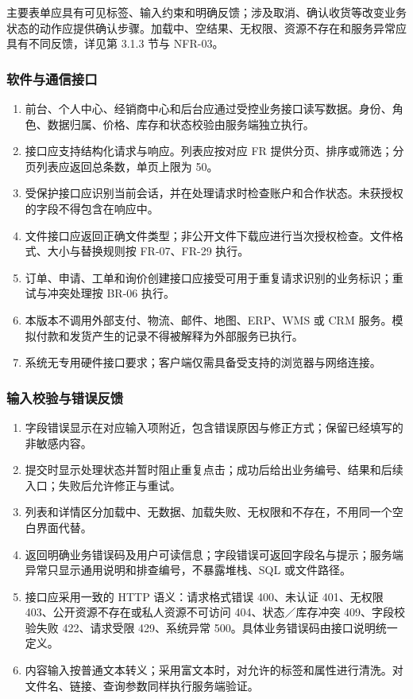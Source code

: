 主要表单应具有可见标签、输入约束和明确反馈；涉及取消、确认收货等改变业务状态的动作应提供确认步骤。加载中、空结果、无权限、资源不存在和服务异常应具有不同反馈，详见第 3.1.3 节与 NFR-03。

\subsubsection{软件与通信接口}\label{sec:312-软件与通信接口}

\begin{enumerate}
\item 前台、个人中心、经销商中心和后台应通过受控业务接口读写数据。身份、角色、数据归属、价格、库存和状态校验由服务端独立执行。
\item 接口应支持结构化请求与响应。列表应按对应 FR 提供分页、排序或筛选；分页列表应返回总条数，单页上限为 50。
\item 受保护接口应识别当前会话，并在处理请求时检查账户和合作状态。未获授权的字段不得包含在响应中。
\item 文件接口应返回正确文件类型；非公开文件下载应进行当次授权检查。文件格式、大小与替换规则按 FR-07、FR-29 执行。
\item 订单、申请、工单和询价创建接口应接受可用于重复请求识别的业务标识；重试与冲突处理按 BR-06 执行。
\item 本版本不调用外部支付、物流、邮件、地图、ERP、WMS 或 CRM 服务。模拟付款和发货产生的记录不得被解释为外部服务已执行。
\item 系统无专用硬件接口要求；客户端仅需具备受支持的浏览器与网络连接。
\end{enumerate}

\subsubsection{输入校验与错误反馈}\label{sec:313-输入校验与错误反馈}

\begin{enumerate}
\item 字段错误显示在对应输入项附近，包含错误原因与修正方式；保留已经填写的非敏感内容。
\item 提交时显示处理状态并暂时阻止重复点击；成功后给出业务编号、结果和后续入口；失败后允许修正与重试。
\item 列表和详情区分加载中、无数据、加载失败、无权限和不存在，不用同一个空白界面代替。
\item 返回明确业务错误码及用户可读信息；字段错误可返回字段名与提示；服务端异常只显示通用说明和排查编号，不暴露堆栈、SQL 或文件路径。
\item 接口应采用一致的 HTTP 语义：请求格式错误 400、未认证 401、无权限 403、公开资源不存在或私人资源不可访问 404、状态／库存冲突 409、字段校验失败 422、请求受限 429、系统异常 500。具体业务错误码由接口说明统一定义。
\item 内容输入按普通文本转义；采用富文本时，对允许的标签和属性进行清洗。对文件名、链接、查询参数同样执行服务端验证。
\end{enumerate}

